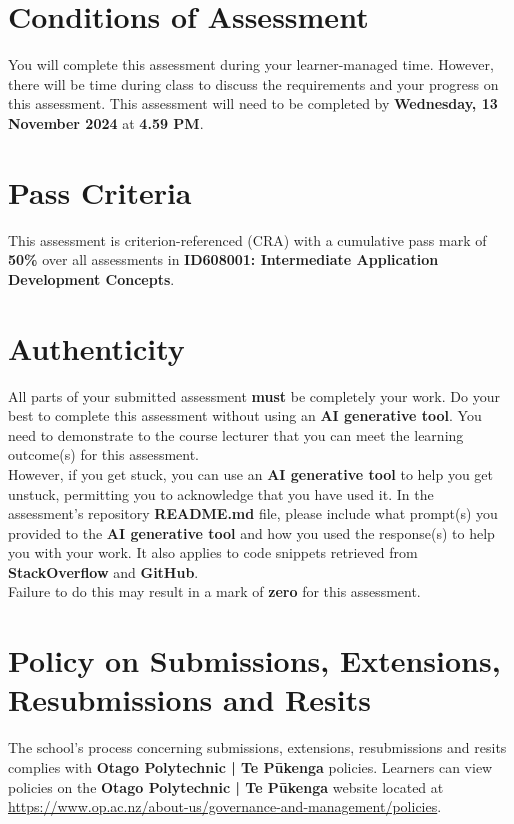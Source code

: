\documentclass{article}
\begin{document}
\section*{Conditions of Assessment}
You will complete this assessment during your learner-managed time. However, there will be time during class to discuss the requirements and your progress on this assessment. This assessment will need to be completed by \textbf{Wednesday, 13 November 2024} at \textbf{4.59 PM}. 

\section*{Pass Criteria}
This assessment is criterion-referenced (CRA) with a cumulative pass mark of \textbf{50\%} over all assessments in \textbf{ID608001: Intermediate Application Development Concepts}.

\section*{Authenticity}
All parts of your submitted assessment \textbf{must} be completely your work. Do your best to complete this assessment without using an \textbf{AI generative tool}. You need to demonstrate to the course lecturer that you can meet the learning outcome(s) for this assessment. \\
 
 However, if you get stuck, you can use an \textbf{AI generative tool} to help you get unstuck, permitting you to acknowledge that you have used it. In the assessment's repository \textbf{README.md} file, please include what prompt(s) you provided to the \textbf{AI generative tool} and how you used the response(s) to help you with your work. It also applies to code snippets retrieved from \textbf{StackOverflow} and \textbf{GitHub}. \\
 
 Failure to do this may result in a mark of \textbf{zero} for this assessment.

\section*{Policy on Submissions, Extensions, Resubmissions and Resits}
The school's process concerning submissions, extensions, resubmissions and resits complies with \textbf{Otago Polytechnic | Te Pūkenga} policies. Learners can view policies on the \textbf{Otago Polytechnic | Te Pūkenga} website located at \href{https://www.op.ac.nz/about-us/governance-and-management/policies}{https://www.op.ac.nz/about-us/governance-and-management/policies}.
\end{document}
